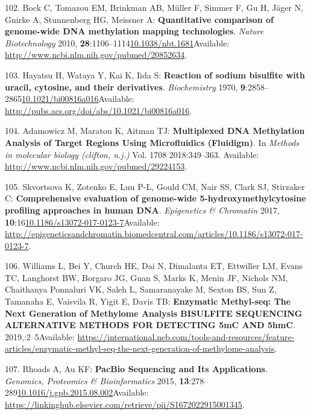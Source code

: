 \documentclass[
]{book}
\begin{document}
\leavevmode\hypertarget{ref-Bock2010}{}%
102. Bock C, Tomazou EM, Brinkman AB, Müller F, Simmer F, Gu H, Jäger N, Gnirke A, Stunnenberg HG, Meissner A: \textbf{Quantitative comparison of genome-wide DNA methylation mapping technologies}. \emph{Nature Biotechnology} 2010, \textbf{28}:1106--1114\href{https://doi.org/10.1038/nbt.1681}{10.1038/nbt.1681}Available: \url{http://www.ncbi.nlm.nih.gov/pubmed/20852634}.

\leavevmode\hypertarget{ref-Hayatsu1970}{}%
103. Hayatsu H, Wataya Y, Kai K, Iida S: \textbf{Reaction of sodium bisulfite with uracil, cytosine, and their derivatives}. \emph{Biochemistry} 1970, \textbf{9}:2858--2865\href{https://doi.org/10.1021/bi00816a016}{10.1021/bi00816a016}Available: \url{http://pubs.acs.org/doi/abs/10.1021/bi00816a016}.

\leavevmode\hypertarget{ref-Adamowicz2018}{}%
104. Adamowicz M, Maratou K, Aitman TJ: \textbf{Multiplexed DNA Methylation Analysis of Target Regions Using Microfluidics (Fluidigm)}. In \emph{Methods in molecular biology (clifton, n.j.)} Vol. 1708 2018:349--363. Available: \url{http://www.ncbi.nlm.nih.gov/pubmed/29224153}.

\leavevmode\hypertarget{ref-Skvortsova2017}{}%
105. Skvortsova K, Zotenko E, Luu P-L, Gould CM, Nair SS, Clark SJ, Stirzaker C: \textbf{Comprehensive evaluation of genome-wide 5-hydroxymethylcytosine profiling approaches in human DNA}. \emph{Epigenetics \& Chromatin} 2017, \textbf{10}:16\href{https://doi.org/10.1186/s13072-017-0123-7}{10.1186/s13072-017-0123-7}Available: \url{http://epigeneticsandchromatin.biomedcentral.com/articles/10.1186/s13072-017-0123-7}.

\leavevmode\hypertarget{ref-Williams2019}{}%
106. Williams L, Bei Y, Church HE, Dai N, Dimalanta ET, Ettwiller LM, Evans TC, Langhorst BW, Borgaro JG, Guan S, Marks K, Menin JF, Nichols NM, Chaithanya Ponnaluri VK, Saleh L, Samaranayake M, Sexton BS, Sun Z, Tamanaha E, Vaisvila R, Yigit E, Davis TB: \textbf{Enzymatic Methyl-seq: The Next Generation of Methylome Analysis BISULFITE SEQUENCING ALTERNATIVE METHODS FOR DETECTING 5mC AND 5hmC}. 2019,:2--5Available: \url{https://international.neb.com/tools-and-resources/feature-articles/enzymatic-methyl-seq-the-next-generation-of-methylome-analysis}.

\leavevmode\hypertarget{ref-Rhoads2015}{}%
107. Rhoads A, Au KF: \textbf{PacBio Sequencing and Its Applications}. \emph{Genomics, Proteomics \& Bioinformatics} 2015, \textbf{13}:278--289\href{https://doi.org/10.1016/j.gpb.2015.08.002}{10.1016/j.gpb.2015.08.002}Available: \url{https://linkinghub.elsevier.com/retrieve/pii/S1672022915001345}.
\end{document}
